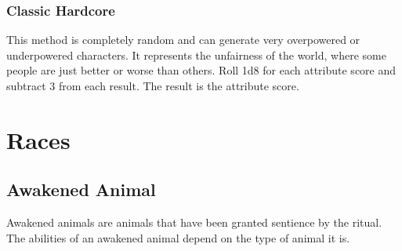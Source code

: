 \begin{comment}
            \subsubsection{Weighted Semi-Randomized Point Buy}
                This method gives you more control over your attribute scores, while still requiring you to deal with attribute score advantages or disadvantages that you might not have chosen. It functions like the semi-randomized point buy method, except that you do not roll 3d6 for every attribute score. You have a pool of 18 dice. You can distribute those dice as you choose between each attribute score, except the last one, which is automatically assigned your remaining points. If you roll more than three dice for an attribute score, keep only the highest 3 dice. If you assign fewer than three dice to roll for an attribute score, add 1 to the result for every die less than 3 you are rolling. You can roll as many as six dice for a single attribute score, and you cannot roll less than one die for an attribute score.

                For example, player hoping to play a barbarian might assign six dice to Strength, five dice to Constitution, three dice to Dexterity, and two dice to each of Intelligence and Wisdom, leaving the rest of the points to Charisma.
\end{comment}

        \subsubsection{Classic Hardcore}

            This method is completely random and can generate very overpowered or underpowered characters. It represents the unfairness of the world, where some people are just better or worse than others. Roll 1d8 for each attribute score and subtract 3 from each result. The result is the attribute score.

            \newpage

\section{Races}

    \subsection{Awakened Animal}

        Awakened animals are animals that have been granted sentience by the  ritual.
        The abilities of an awakened animal depend on the type of animal it is.

